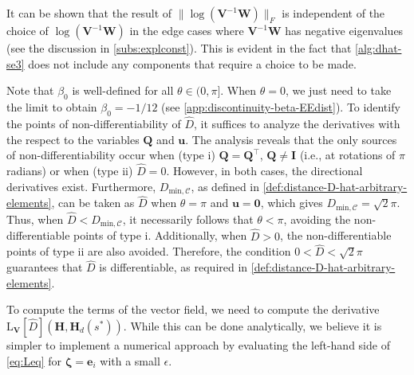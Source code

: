 It can be shown that the result of $\|\log(\mathbf{V}^{-1}\mathbf{W})\|_F$ is independent of the choice of $\log(\mathbf{V}^{-1}\mathbf{W})$ in the edge cases where $\mathbf{V}^{-1}\mathbf{W}$ has negative eigenvalues (see the discussion in \cref{subs:explconst}). This is evident in the fact that \cref{alg:dhat-se3} does not include any components that require a choice to be made.

Note that $\beta_0$ is well-defined for all $\theta \in (0,\pi]$. When $\theta=0$, we just need to take the limit to obtain $\beta_0=-1/12$ (see \cref{app:discontinuity-beta-EEdist}). To identify the points of non-differentiability of $\widehat{D}$, it suffices to analyze the derivatives with the respect to the variables $\mathbf{Q}$ and $\mathbf{u}$. The analysis reveals that the only sources of non-differentiability occur when (type i) $\mathbf{Q}=\mathbf{Q}^\top$, $\mathbf{Q} \not= \mathbf{I}$ (i.e., at rotations of $\pi$ radians) or when (type ii) $\widehat{D}=0$. However, in both cases, the directional derivatives exist. Furthermore, $D_{\text{min},\mathcal{C}}$, as defined in \cref{def:distance-D-hat-arbitrary-elements}, can be taken as $\widehat{D}$ when $\theta = \pi$  and $\mathbf{u} = \mathbf{0}$, which gives $D_{\text{min},\mathcal{C}} = \sqrt{2}\pi$. Thus, when $\widehat{D} < D_{\text{min},\mathcal{C}}$, it necessarily follows that $\theta < \pi$, avoiding the non-differentiable points of type i. Additionally, when $\widehat{D} > 0$, the non-differentiable points of type ii are also avoided. Therefore, the condition $0 < \widehat{D} < \sqrt{2}\pi$ guarantees that $\widehat{D}$ is differentiable, as required in \cref{def:distance-D-hat-arbitrary-elements}.

To compute the terms of the vector field, we need to compute the derivative $\text{L}_{\mathbf{V}}[\widehat{D}](\mathbf{H}, \mathbf{H}_d(s^*))$. While this can be done analytically, we believe it is simpler to implement a numerical approach by evaluating the left-hand side of \eqref{eq:Leq} for $\boldsymbol{\zeta} = \mathbf{e}_i$ with a small $\epsilon$.

